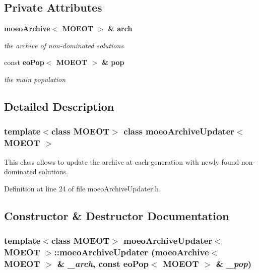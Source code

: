 \subsection*{Private Attributes}
\begin{CompactItemize}
\item 
\bf{moeo\-Archive}$<$ MOEOT $>$ \& \bf{arch}\label{classmoeoArchiveUpdater_64531e46898b0e2a4ec48ba28dbfd59d}

\begin{CompactList}\small\item\em the archive of non-dominated solutions \item\end{CompactList}\item 
const \bf{eo\-Pop}$<$ MOEOT $>$ \& \bf{pop}\label{classmoeoArchiveUpdater_a7ba8cde3727d1f24835083e85dfd70d}

\begin{CompactList}\small\item\em the main population \item\end{CompactList}\end{CompactItemize}


\subsection{Detailed Description}
\subsubsection*{template$<$class MOEOT$>$ class moeo\-Archive\-Updater$<$ MOEOT $>$}

This class allows to update the archive at each generation with newly found non-dominated solutions. 



Definition at line 24 of file moeo\-Archive\-Updater.h.

\subsection{Constructor \& Destructor Documentation}
\subsubsection{\setlength{\rightskip}{0pt plus 5cm}template$<$class MOEOT$>$ \bf{moeo\-Archive\-Updater}$<$ MOEOT $>$::\bf{moeo\-Archive\-Updater} (\bf{moeo\-Archive}$<$ MOEOT $>$ \& {\em \_\-arch}, const \bf{eo\-Pop}$<$ MOEOT $>$ \& {\em \_\-pop})\hspace{0.3cm}{\tt  [inline]}}\label{classmoeoArchiveUpdater_1497a2bc8df12565b3ea21bb8e08bee1}


